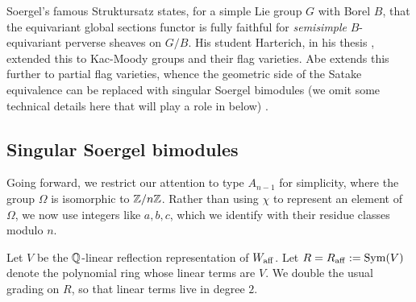 {Soergel's famous Struktursatz \cite{SoerXX} states, for a simple Lie group $G$ with Borel $B$, that the equivariant global sections functor is fully faithful for \emph{semisimple} $B$-equivariant perverse sheaves on $G/B$. His student Harterich, in his thesis \cite{Harterich}, extended this to Kac-Moody groups and their flag varieties. Abe \cite{Abe} extends this further to partial flag varieties, whence the geometric side of the Satake equivalence can be replaced with singular Soergel bimodules (we omit some technical details here that will play a role in  below) .

\subsection{Singular Soergel bimodules}

Going forward, we restrict our attention to type $A_{n-1}$ for simplicity, where the group $\Omega$ is isomorphic to $\mathbb{Z}/n\mathbb{Z}$. Rather than using $\chi$ to represent an element of $\Omega$, we now use integers like $a, b, c$, which we identify with their residue classes modulo $n$.

Let $V$ be the $\mathbb{Q}$-linear reflection representation of $W_{\operatorname{aff}}$. Let $R = R_{\operatorname{aff}} := \operatorname{Sym}(V)$ denote the polynomial ring whose linear terms are $V$. We double the usual grading on $R$, so that linear terms live in degree $2$.

}
